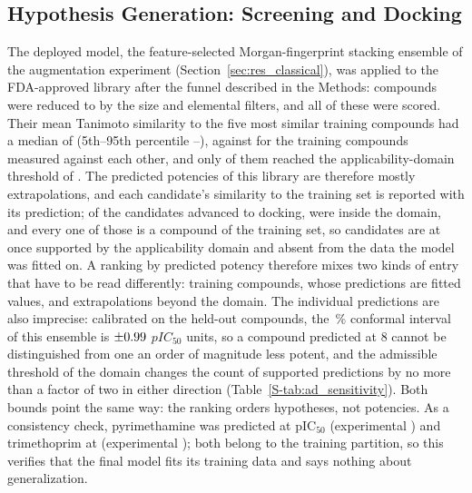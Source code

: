 \subsection{Hypothesis Generation: Screening and Docking}
\label{sec:screening_results}
\label{sec:consensus_results}

The deployed model, the feature-selected Morgan-fingerprint stacking ensemble of the augmentation experiment (Section~\ref{sec:res_classical}), was applied to the FDA-approved library after the funnel described in the Methods: \ScreenNLibrary{} compounds were reduced to \ScreenNStructural{} by the size and elemental filters, and all of these were scored. Their mean Tanimoto similarity to the five most similar training compounds had a median of \ScreenADFdaMedian{} (5th--95th percentile \ScreenADFdaLow{}--\ScreenADFdaHigh{}), against \ScreenADTrainMedian{} for the training compounds measured against each other, and only \ScreenNDomain{} of them reached the applicability-domain threshold of \ScreenADMinSimilarity{}. The predicted potencies of this library are therefore mostly extrapolations, and each candidate's similarity to the training set is reported with its prediction; of the \ScreenNCandidates{} candidates advanced to docking, \ScreenNCandidatesInDomain{} were inside the domain, and every one of those is a compound of the training set, so \ScreenNCandidatesInDomainNovel{} candidates are at once supported by the applicability domain and absent from the data the model was fitted on. A ranking by predicted potency therefore mixes two kinds of entry that have to be read differently: training compounds, whose predictions are fitted values, and extrapolations beyond the domain. The individual predictions are also imprecise: calibrated on the \ScreenConformalNCal{} held-out compounds, the \ScreenConformalCoverage{}\,\% conformal interval of this ensemble is $\pm0.99{}$ $pIC_{50}$ units, so a compound predicted at 8 cannot be distinguished from one an order of magnitude less potent, and the admissible threshold of the domain changes the count of supported predictions by no more than a factor of two in either direction (Table~\ref{S-tab:ad_sensitivity}). Both bounds point the same way: the ranking orders hypotheses, not potencies. As a consistency check, pyrimethamine was predicted at pIC$_{50}$ \ControlPyrimethaminePred{} (experimental \ControlPyrimethamineExp{}) and trimethoprim at \ControlTrimethoprimPred{} (experimental \ControlTrimethoprimExp{}); both belong to the training partition, so this verifies that the final model fits its training data and says nothing about generalization.


